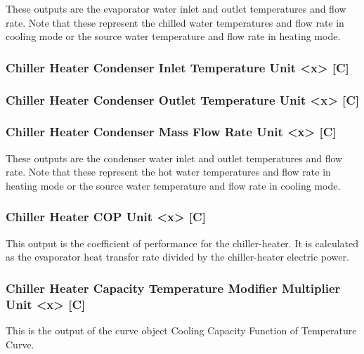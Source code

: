 These outputs are the evaporator water inlet and outlet temperatures and flow rate. Note that these represent the chilled water temperatures and flow rate in cooling mode or the source water temperature and flow rate in heating mode.

\subsubsection{Chiller Heater Condenser Inlet Temperature Unit \textless{}x\textgreater{} {[}C{]}}\label{chiller-heater-condenser-inlet-temperature-unit-x-c}

\subsubsection{Chiller Heater Condenser Outlet Temperature Unit \textless{}x\textgreater{} {[}C{]}}\label{chiller-heater-condenser-outlet-temperature-unit-x-c}

\subsubsection{Chiller Heater Condenser Mass Flow Rate Unit \textless{}x\textgreater{} {[}C{]}}\label{chiller-heater-condenser-mass-flow-rate-unit-x-c}

These outputs are the condenser water inlet and outlet temperatures and flow rate. Note that these represent the hot water temperatures and flow rate in heating mode or the source water temperature and flow rate in cooling mode.

\subsubsection{Chiller Heater COP Unit \textless{}x\textgreater{} {[}C{]}}\label{chiller-heater-cop-unit-x-c}

This output is the coefficient of performance for the chiller-heater. It is calculated as the evaporator heat transfer rate divided by the chiller-heater electric power.

\subsubsection{Chiller Heater Capacity Temperature Modifier Multiplier Unit \textless{}x\textgreater{} {[}C{]}}\label{chiller-heater-capacity-temperature-modifier-multiplier-unit-x-c}

This is the output of the curve object Cooling Capacity Function of Temperature Curve.

